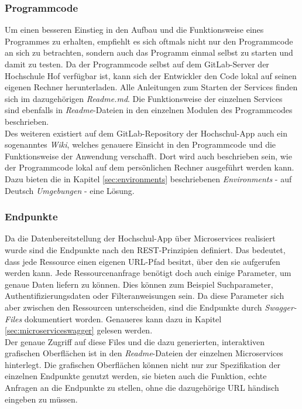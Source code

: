 \subsubsection*{Programmcode}
\label{sec:doku_programmcode}
Um einen besseren Einstieg in den Aufbau und die Funktionsweise eines Programmes zu erhalten, empfiehlt es sich oftmals nicht nur den Programmcode an sich zu betrachten, sondern auch das Programm einmal selbst zu starten und damit zu testen. Da der Programmcode selbst auf dem GitLab-Server der Hochschule Hof verfügbar ist, kann sich der Entwickler den Code lokal auf seinen eigenen Rechner herunterladen. Alle Anleitungen zum Starten der Services finden sich im dazugehörigen \textit{Readme.md}. Die Funktionsweise der einzelnen Services sind ebenfalls in \textit{Readme}-Dateien in den einzelnen Modulen des Programmcodes beschrieben.\\
\linebreak
Des weiteren existiert auf dem GitLab-Repository der Hochschul-\ac{App} auch ein sogenanntes \textit{Wiki}, welches genauere Einsicht in den Programmcode und die Funktionsweise der Anwendung verschafft. Dort wird auch beschrieben sein, wie der Programmcode lokal auf dem persönlichen Rechner ausgeführt werden kann. Dazu bieten die in Kapitel \ref{sec:environments} beschriebenen \textit{Environments} - auf Deutsch \textit{Umgebungen} - eine Lösung. 

\subsubsection*{Endpunkte}
\label{sec:doku_endpunkte}
Da die Datenbereitstellung der Hochschul-\ac{App} über Microservices realisiert wurde sind die Endpunkte nach den \ac{REST}-Prinzipien definiert. Das bedeutet, dass jede Ressource einen eigenen \ac{URL}-Pfad besitzt, über den sie aufgerufen werden kann. Jede Ressourcenanfrage benötigt doch auch einige Parameter, um genaue Daten liefern zu können. Dies können zum Beispiel Suchparameter, Authentifizierungsdaten oder Filteranweisungen sein. Da diese Parameter sich aber zwischen den Ressourcen unterscheiden, sind die Endpunkte durch \textit{Swagger-Files} dokumentiert worden. Genaueres kann dazu in Kapitel \ref{sec:microserviceswagger} gelesen werden.\\
\linebreak
Der genaue Zugriff auf diese Files und die dazu generierten, interaktiven grafischen Oberflächen ist in den \textit{Readme}-Dateien der einzelnen Microservices hinterlegt. Die grafischen Oberflächen können nicht nur zur Spezifikation der einzelnen Endpunkte genutzt werden, sie bieten auch die Funktion, echte Anfragen an die Endpunkte zu stellen, ohne die dazugehörige \ac{URL} händisch eingeben zu müssen.


